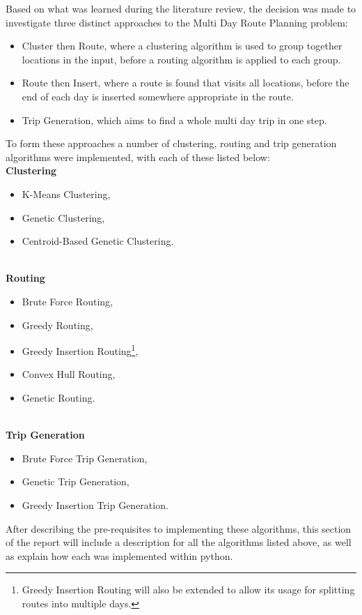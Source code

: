 Based on what was learned during the literature review, the decision was made to investigate three distinct approaches
to the Multi Day Route Planning problem:
\begin{itemize}
    \item Cluster then Route, where a clustering algorithm is used to group together locations in the input,
    before a routing algorithm is applied to each group.
    \item Route then Insert, where a route is found that visits all locations, before the end of each day is
    inserted somewhere appropriate in the route.
    \item Trip Generation, which aims to find a whole multi day trip in one step.
\end{itemize}
To form these approaches a number of clustering, routing and trip generation algorithms were implemented, with each
of these listed below:\\
\noindent
\textbf{Clustering}
\begin{itemize}
    \item K-Means Clustering,
    \item Genetic Clustering,
    \item Centroid-Based Genetic Clustering.
\end{itemize}\\
\noindent
\textbf{Routing}
\begin{itemize}
    \item Brute Force Routing,
    \item Greedy Routing,
    \item Greedy Insertion Routing\footnote{Greedy Insertion Routing will also be extended to allow its usage for splitting routes into multiple days.},
    \item Convex Hull Routing,
    \item Genetic Routing.
\end{itemize}\\
\noindent
\textbf{Trip Generation}
\begin{itemize}
    \item Brute Force Trip Generation,
    \item Genetic Trip Generation,
    \item Greedy Insertion Trip Generation.
\end{itemize}

\noindent
After describing the pre-requisites to implementing these algorithms, this section of the report will include a
description for all the algorithms listed above, as well as explain how each was implemented within python.

